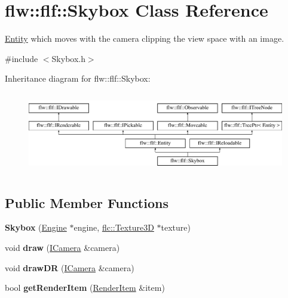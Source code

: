 \hypertarget{classflw_1_1flf_1_1Skybox}{}\section{flw\+:\+:flf\+:\+:Skybox Class Reference}
\label{classflw_1_1flf_1_1Skybox}


\hyperlink{classflw_1_1flf_1_1Entity}{Entity} which moves with the camera clipping the view space with an image.  




{\ttfamily \#include $<$Skybox.\+h$>$}

Inheritance diagram for flw\+:\+:flf\+:\+:Skybox\+:\begin{figure}[H]
\begin{center}
\leavevmode
\includegraphics[height=3.589744cm]{classflw_1_1flf_1_1Skybox}
\end{center}
\end{figure}
\subsection*{Public Member Functions}
\begin{DoxyCompactItemize}
\item 
{\bfseries Skybox} (\hyperlink{classflw_1_1Engine}{Engine} $\ast$engine, \hyperlink{classflw_1_1flc_1_1Texture3D}{flc\+::\+Texture3D} $\ast$texture)\hypertarget{classflw_1_1flf_1_1Skybox_a676e7c813bc505d212ff6e7653509662}{}\label{classflw_1_1flf_1_1Skybox_a676e7c813bc505d212ff6e7653509662}

\item 
void {\bfseries draw} (\hyperlink{classflw_1_1flf_1_1ICamera}{I\+Camera} \&camera)\hypertarget{classflw_1_1flf_1_1Skybox_a59640fb89ee41d38e991d351921626af}{}\label{classflw_1_1flf_1_1Skybox_a59640fb89ee41d38e991d351921626af}

\item 
void {\bfseries draw\+DR} (\hyperlink{classflw_1_1flf_1_1ICamera}{I\+Camera} \&camera)\hypertarget{classflw_1_1flf_1_1Skybox_a301efdf18a2572682f3a10ab44ffe457}{}\label{classflw_1_1flf_1_1Skybox_a301efdf18a2572682f3a10ab44ffe457}

\item 
bool {\bfseries get\+Render\+Item} (\hyperlink{structflw_1_1flf_1_1RenderItem}{Render\+Item} \&item)\hypertarget{classflw_1_1flf_1_1Skybox_aab7e845c4c6d95c24a6995c6e637f90d}{}\label{classflw_1_1flf_1_1Skybox_aab7e845c4c6d95c24a6995c6e637f90d}

\end{DoxyCompactItemize}
